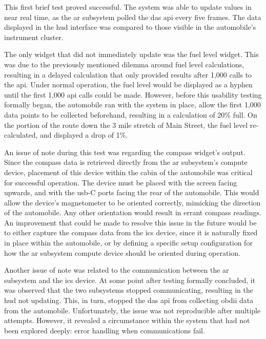     \par This first brief test proved successful. The system was able to update values in near real time, as the \gls{ar} subsystem polled the \gls{das} \gls{api} every five frames. The data displayed in the \gls{hud} interface was compared to those visible in the automobile's instrument cluster.

    \par The only widget that did not immediately update was the fuel level widget. This was due to the previously mentioned dilemma around fuel level calculations, resulting in a delayed calculation that only provided results after 1,000 calls to the \gls{api}. Under normal operation, the fuel level would be displayed as a hyphen until the first 1,000 \gls{api} calls could be made. However, before this usability testing formally began, the automobile ran with the system in place, allow the first 1,000 data points to be collected beforehand, resulting in a calculation of 20\% full. On the portion of the route down the 3 mile stretch of Main Street, the fuel level re-calculated, and displayed a drop of 1\%.

    \par An issue of note during this test was regarding the compass widget's output. Since the compass data is retrieved directly from the \gls{ar} subsystem's compute device, placement of this device within the cabin of the automobile was critical for successful operation. The device must be placed with the screen facing upwards, and with the \gls{usb}-C ports facing the rear of the automobile. This would allow the device's magnetometer to be oriented correctly, mimicking the direction of the automobile. Any other orientation would result in errant compass readings. An improvement that could be made to resolve this issue in the future would be to either capture the compass data from the \gls{ics} device, since it is naturally fixed in place within the automobile, or by defining a specific setup configuration for how the \gls{ar} subsystem compute device should be oriented during operation.

    \par Another issue of note was related to the communication between the \gls{ar} subsystem and the \gls{ics} device. At some point after testing formally concluded, it was observed that the two subsystems stopped communicating, resulting in the \gls{hud} not updating. This, in turn, stopped the \gls{das} \gls{api} from collecting \gls{obdii} data from the automobile. Unfortunately, the issue was not reproducible after multiple attempts. However, it revealed a circumstance within the system that had not been explored deeply: error handling when communications fail.

